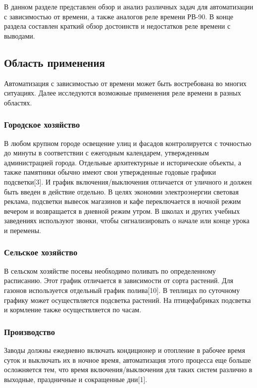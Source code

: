 В данном разделе представлен обзор и анализ различных задач для автоматизации с зависимостью от времени, а также аналогов реле времени РВ-90. В конце раздела составлен краткий обзор достоинств и недостатков реле времени с выводами.


\subsection{Область применения}
Автоматизация с зависимостью от времени может быть востребована во многих  ситуациях. Далее исследуются возможные применения реле времени в разных областях.

\subsubsection{Городское хозяйство}
В любом крупном городе освещение улиц и фасадов контролируется с точностью до минуты в соответствии с ежегодным календарем, утвержденным администрацией города. Отдельные архитектурные и исторические объекты, а также памятники обычно имеют свои утвержденные годовые графики подсветки[3]. И график включения/выключения отличается от уличного и должен быть введен в действие отдельно. В целях экономии электроэнергии световая реклама, подсветки вывесок магазинов и кафе переключается в ночной режим вечером и возвращается в дневной режим утром. В школах и других  учебных заведениях используют звонки, чтобы сигнализировать о начале или конце урока и перемены.


\subsubsection{Сельское хозяйство}
В сельском хозяйстве посевы необходимо поливать по определенному расписанию. Этот график отличается в зависимости от сорта растений. Для газонов используется отдельный график полива[10]. В теплицах по суточному графику может осуществляется подсветка растений. На птицефабриках подсветка и кормление также осуществляется по часам.


\subsubsection{Производство}
Заводы должны ежедневно включать кондиционер и отопление в рабочее время суток и выключать их в ночное время, автоматизация этого процесса еще больше осложняется тем, что время включения/выключения для таких систем различно в выходные, праздничные и сокращенные дни[1]. 


